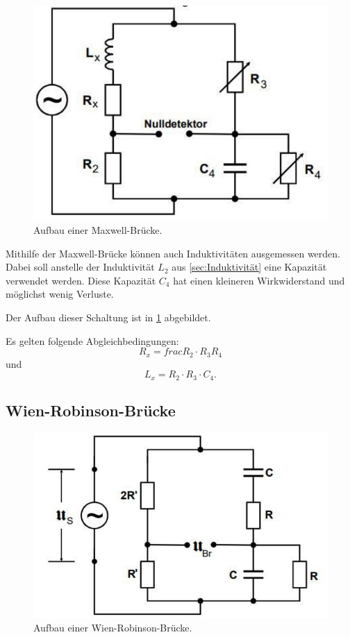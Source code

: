 \begin{figure}
    \centering
    \includegraphics[width=\textwidth]{MaxwellBruecke.pdf}
    \caption{Aufbau einer Maxwell-Brücke. \cite[7]{anleitung}}
    \label{fig:Maxwell}
\end{figure}

Mithilfe der Maxwell-Brücke können auch Induktivitäten ausgemessen werden.
Dabei soll anstelle der Induktivität $L_2$ aus \ref{sec:Induktivität} eine Kapazität verwendet werden.
Diese Kapazität $C_4$ hat einen kleineren Wirkwiderstand und möglichst wenig Verluste.

Der Aufbau dieser Schaltung ist in \ref{fig:Maxwell} abgebildet.

Es gelten folgende Abgleichbedingungen:
\begin{equation}
    R_x = frac{R_2 \cdot R_3}{R_4}
\end{equation}
und
\begin{equation}
    L_x = R_2 \cdot R_3 \cdot C_4 .
\end{equation}

\subsection{Wien-Robinson-Brücke}

\begin{figure}
    \centering
    \includegraphics[width=\textwidth]{WienRobinBruecke.pdf}
    \caption{Aufbau einer Wien-Robinson-Brücke. \cite[8]{anleitung}}
\end{figure}

